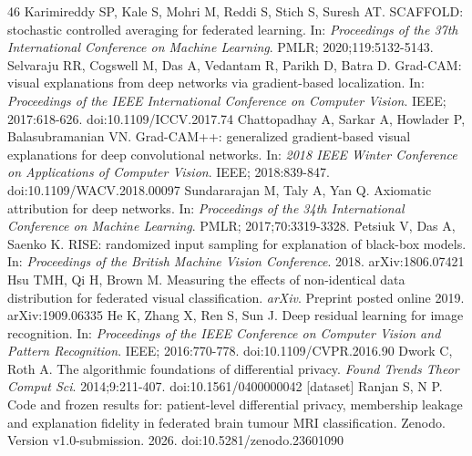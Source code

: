 \begin{thebibliography}{46}
 Karimireddy SP, Kale S, Mohri M, Reddi S, Stich S, Suresh AT. SCAFFOLD: stochastic controlled averaging for federated learning. In: \textit{Proceedings of the 37th International Conference on Machine Learning}. PMLR; 2020;119:5132-5143.
 Selvaraju RR, Cogswell M, Das A, Vedantam R, Parikh D, Batra D. Grad-CAM: visual explanations from deep networks via gradient-based localization. In: \textit{Proceedings of the IEEE International Conference on Computer Vision}. IEEE; 2017:618-626. doi:10.1109/ICCV.2017.74
 Chattopadhay A, Sarkar A, Howlader P, Balasubramanian VN. Grad-CAM++: generalized gradient-based visual explanations for deep convolutional networks. In: \textit{2018 IEEE Winter Conference on Applications of Computer Vision}. IEEE; 2018:839-847. doi:10.1109/WACV.2018.00097
 Sundararajan M, Taly A, Yan Q. Axiomatic attribution for deep networks. In: \textit{Proceedings of the 34th International Conference on Machine Learning}. PMLR; 2017;70:3319-3328.
 Petsiuk V, Das A, Saenko K. RISE: randomized input sampling for explanation of black-box models. In: \textit{Proceedings of the British Machine Vision Conference}. 2018. arXiv:1806.07421
 Hsu TMH, Qi H, Brown M. Measuring the effects of non-identical data distribution for federated visual classification. \textit{arXiv}. Preprint posted online 2019. arXiv:1909.06335
 He K, Zhang X, Ren S, Sun J. Deep residual learning for image recognition. In: \textit{Proceedings of the IEEE Conference on Computer Vision and Pattern Recognition}. IEEE; 2016:770-778. doi:10.1109/CVPR.2016.90
 Dwork C, Roth A. The algorithmic foundations of differential privacy. \textit{Found Trends Theor Comput Sci}. 2014;9:211-407. doi:10.1561/0400000042
 [dataset] Ranjan S, N P. Code and frozen results for: patient-level differential privacy, membership leakage and explanation fidelity in federated brain tumour MRI classification. Zenodo. Version v1.0-submission. 2026. doi:10.5281/zenodo.23601090
\end{thebibliography}
